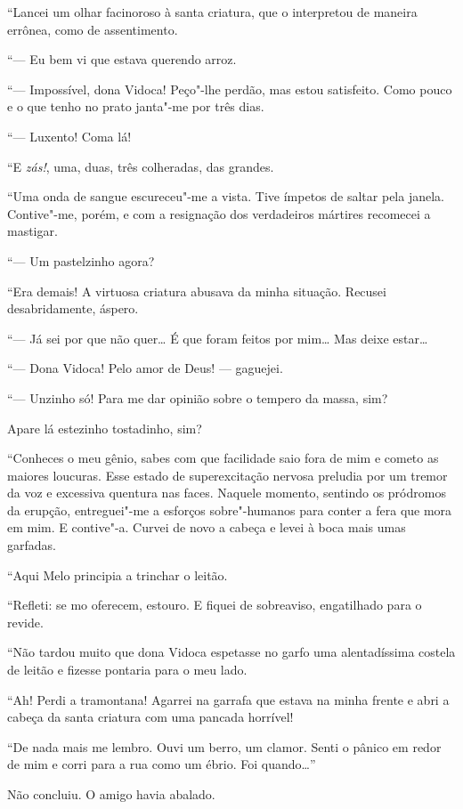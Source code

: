 ``Lancei um olhar facinoroso à santa criatura, que o interpretou de
maneira errônea, como de assentimento.

``--- Eu bem vi que estava querendo arroz.

``--- Impossível, dona Vidoca! Peço"-lhe perdão, mas estou satisfeito.
Como pouco e o que tenho no prato janta"-me por três dias.

``--- Luxento! Coma lá!

``E \emph{zás!}, uma, duas, três colheradas, das grandes.

``Uma onda de sangue escureceu"-me a vista. Tive ímpetos de saltar pela
janela. Contive"-me, porém, e com a resignação dos verdadeiros mártires
recomecei a mastigar.

``--- Um pastelzinho agora?

``Era demais! A virtuosa criatura abusava da minha situação. Recusei
desabridamente, áspero.

``--- Já sei por que não quer\ldots{} É que foram feitos por mim\ldots{} Mas deixe
estar\ldots{}

``--- Dona Vidoca! Pelo amor de Deus! --- gaguejei.

``--- Unzinho só! Para me dar opinião sobre o tempero da massa, sim?

Apare lá estezinho tostadinho, sim?

``Conheces o meu gênio, sabes com que facilidade saio fora de mim e
cometo as maiores loucuras. Esse estado de superexcitação nervosa
preludia por um tremor da voz e excessiva quentura nas faces. Naquele
momento, sentindo os pródromos da erupção, entreguei"-me a esforços
sobre"-humanos para conter a fera que mora em mim. E contive"-a. Curvei de
novo a cabeça e levei à boca mais umas garfadas.

``Aqui Melo principia a trinchar o leitão.

``Refleti: se mo oferecem, estouro. E fiquei de sobreaviso, engatilhado
para o revide.

``Não tardou muito que dona Vidoca espetasse no garfo uma alentadíssima
costela de leitão e fizesse pontaria para o meu lado.

``Ah! Perdi a tramontana! Agarrei na garrafa que estava na minha frente
e abri a cabeça da santa criatura com uma pancada horrível!

``De nada mais me lembro. Ouvi um berro, um clamor. Senti o pânico em
redor de mim e corri para a rua como um ébrio. Foi quando\ldots{}''

Não concluiu. O amigo havia abalado.

